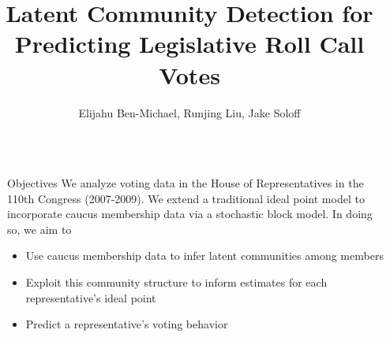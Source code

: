 \documentclass[final]{beamer}
\title{Latent Community Detection for Predicting Legislative Roll Call Votes} %
\author{Elijahu Ben-Michael, Runjing Liu, Jake Soloff } %
\institute{Department of Statistics, UC Berkeley} %
\newlength{\sepwid}
\newlength{\onecolwid}
\begin{document}

\setlength{\belowcaptionskip}{2ex} %
\setlength\belowdisplayshortskip{2ex} %

\begin{frame}[t] %

\begin{columns}[t] %

\begin{column}{\sepwid}\end{column} %

\begin{column}{\onecolwid} %


\begin{alertblock}{Objectives}
We analyze voting data in the House of Representatives in the 110th Congress (2007-2009). We extend a traditional ideal point model to incorporate caucus membership data via a stochastic block model. In doing so, we aim to 
\begin{itemize}
\item Use caucus membership data to infer latent communities among members
\item Exploit this community structure to inform estimates for each representative's ideal point
\item Predict a representative's voting behavior
\end{itemize}

\end{alertblock}



\end{column}
\end{columns}
\end{frame}
\end{document}
